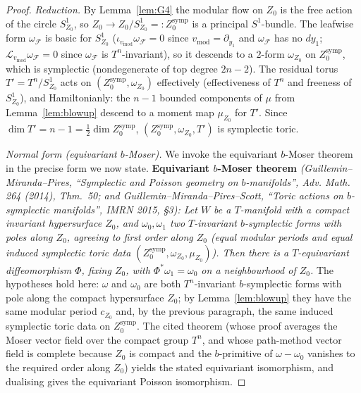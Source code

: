 \documentclass{amsart}
\theoremstyle{definition}
\begin{document}
\begin{proof}
\emph{Reduction.} By Lemma~\ref{lem:G4} the modular flow on $Z_0$ is the free
action of the circle $S^1_{Z_0}$, so $Z_0\to Z_0/S^1_{Z_0}=:Z_0^{\mathrm{symp}}$
is a principal $S^1$-bundle. The leafwise form $\omega_{\mathcal F}$ is basic for
$S^1_{Z_0}$ ($\iota_{v_{\mathrm{mod}}}\omega_{\mathcal F}=0$ since
$v_{\mathrm{mod}}=\partial_{y_1}$ and $\omega_{\mathcal F}$ has no $dy_1$;
$\mathcal L_{v_{\mathrm{mod}}}\omega_{\mathcal F}=0$ since $\omega_{\mathcal F}$
is $T^n$-invariant), so it descends to a $2$-form $\omega_{Z_0}$ on
$Z_0^{\mathrm{symp}}$, which is symplectic (nondegenerate of top degree $2n-2$).
The residual torus $T'=T^n/S^1_{Z_0}$ acts on $(Z_0^{\mathrm{symp}},
\omega_{Z_0})$ effectively (effectiveness of $T^n$ and freeness of
$S^1_{Z_0}$), and Hamiltonianly: the $n-1$ bounded components of $\mu$ from
Lemma~\ref{lem:blowup} descend to a moment map $\mu_{Z_0}$ for $T'$. Since
$\dim T'=n-1=\tfrac12\dim Z_0^{\mathrm{symp}}$, $(Z_0^{\mathrm{symp}},
\omega_{Z_0},T')$ is symplectic toric.

\emph{Normal form (equivariant $b$-Moser).} We invoke the equivariant $b$-Moser
theorem in the precise form we now state. \textbf{Equivariant $b$-Moser
theorem} \emph{(Guillemin--Miranda--Pires, ``Symplectic and Poisson geometry on
$b$-manifolds'', Adv. Math. 264 (2014), Thm.\ 50; and Guillemin--Miranda--Pires--Scott,
``Toric actions on $b$-symplectic manifolds'', IMRN 2015, \S3): Let $W$ be a
$T$-manifold with a compact invariant hypersurface $Z_0$, and $\omega_0,\omega_1$
two $T$-invariant $b$-symplectic forms with poles along $Z_0$, agreeing to
first order along $Z_0$ (equal modular periods and equal induced symplectic toric
data $(Z_0^{\mathrm{symp}},\omega_{Z_0},\mu_{Z_0})$). Then there is a
$T$-equivariant diffeomorphism $\Phi$, fixing $Z_0$, with $\Phi^*\omega_1=
\omega_0$ on a neighbourhood of $Z_0$.} The hypotheses hold here: $\omega$ and
$\omega_0$ are both $T^n$-invariant $b$-symplectic forms with pole along the
compact hypersurface $Z_0$; by Lemma~\ref{lem:blowup} they have the same modular
period $c_{Z_0}$ and, by the previous paragraph, the same induced symplectic
toric data on $Z_0^{\mathrm{symp}}$. The cited theorem (whose proof averages the
Moser vector field over the compact group $T^n$, and whose path-method vector
field is complete because $Z_0$ is compact and the $b$-primitive of
$\omega-\omega_0$ vanishes to the required order along $Z_0$) yields the stated
equivariant isomorphism, and dualising gives the equivariant Poisson
isomorphism.
\end{proof}
\end{document}

